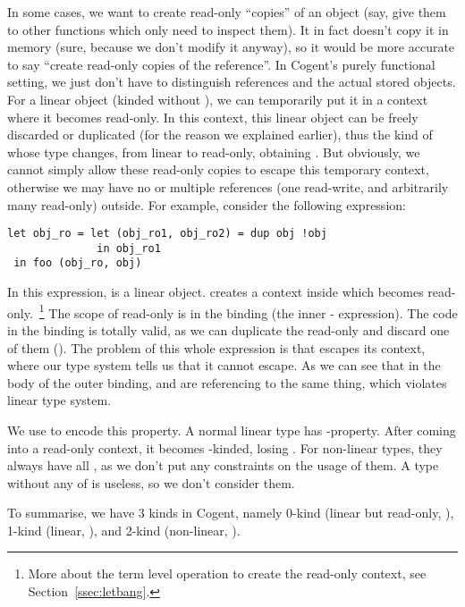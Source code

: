 \documentclass[a4paper]{article}
\newcommand{\cogent}{Cogent\xspace}
\begin{document}
In some cases, we want to create read-only ``copies'' of an object (say, give them to other functions which only need to inspect them).
It in fact doesn't copy it in memory (sure, because we don't modify it anyway), so it would be more accurate to say ``create read-only
copies of the reference''. In \cogent's purely functional setting, we just don't have to distinguish references and the actual stored objects.
For a linear object (kinded without ), we can temporarily put it in a context where it becomes read-only. In this context, this
linear object can be freely discarded or duplicated (for the reason we explained earlier), thus the kind of whose type changes,
from linear to read-only, obtaining . But obviously, we cannot simply allow these read-only copies to escape
this temporary context, otherwise we may have no or multiple references (one read-write, and arbitrarily many read-only) outside. For
example, consider the following expression:
\begin{lstlisting}[language=Cogent]
let obj_ro = let (obj_ro1, obj_ro2) = dup obj !obj
              in obj_ro1
 in foo (obj_ro, obj)
\end{lstlisting}
In this expression,  is a linear object.  creates a context inside which  becomes read-only.~\footnote{More
about the term level operation to create the read-only context, see Section~\ref{ssec:letbang}.}
The scope of read-only  is in the binding (the inner - expression). The code in the binding is totally
valid, as we can duplicate the read-only  and discard one of them (). The problem of this whole expression
is that  escapes its context, where our type system tells us that it cannot escape. As we can see that in
the body of the outer binding,  and  are referencing to the same thing, which violates linear type system.

We use  to encode this property. A normal
linear type has -property. After coming into a read-only context, it becomes -kinded, losing . For non-linear types,
they always have all , as we don't put any constraints on the usage of them. A type without any of  is useless, so
we don't consider them.

To summarise, we have 3 kinds in \cogent, namely 0-kind (linear but read-only, ),
1-kind (linear, ), and 2-kind (non-linear, ).
\end{document}
